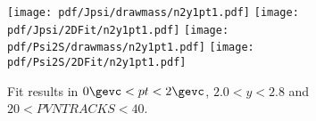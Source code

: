\begin{figure}[H]
\begin{center}
\texttt{[image: pdf/Jpsi/drawmass/n2y1pt1.pdf]}
\texttt{[image: pdf/Jpsi/2DFit/n2y1pt1.pdf]}
\vspace*{-0.5cm}
\texttt{[image: pdf/Psi2S/drawmass/n2y1pt1.pdf]}
\texttt{[image: pdf/Psi2S/2DFit/n2y1pt1.pdf]}
\vspace*{-0.5cm}
\end{center}
\caption{Fit results in $0\gevc<pt<2\gevc$, $2.0<y<2.8$ and $20<PVNTRACKS<40$.}
\label{Fitn2y1pt1}
\end{figure}
